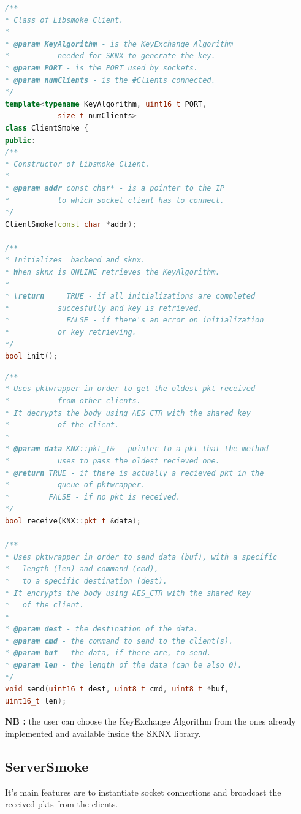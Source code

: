 \vspace{5mm}
\begin{lstlisting}[language=C++, caption={ClientSmoke}]
/**
* Class of Libsmoke Client.
*
* @param KeyAlgorithm - is the KeyExchange Algorithm
*			needed for SKNX to generate the key.
* @param PORT - is the PORT used by sockets.
* @param numClients - is the #Clients connected.
*/
template<typename KeyAlgorithm, uint16_t PORT,
			size_t numClients>
class ClientSmoke {
public:
/**
* Constructor of Libsmoke Client.
*
* @param addr const char* - is a pointer to the IP
*			to which socket client has to connect.
*/
ClientSmoke(const char *addr);

/**
* Initializes _backend and sknx.
* When sknx is ONLINE retrieves the KeyAlgorithm.
*
* \return     TRUE - if all initializations are completed
*			succesfully and key is retrieved.
*             FALSE - if there's an error on initialization
*			or key retrieving.
*/
bool init();
\end{lstlisting}

\newpage
\begin{lstlisting}[language=C++, caption={ClientSmoke}]
/**
* Uses pktwrapper in order to get the oldest pkt received
*			from other clients.
* It decrypts the body using AES_CTR with the shared key
*			of the client.
*
* @param data KNX::pkt_t& - pointer to a pkt that the method
*			uses to pass the oldest recieved one.
* @return TRUE - if there is actually a recieved pkt in the
*			queue of pktwrapper.
*         FALSE - if no pkt is received.
*/
bool receive(KNX::pkt_t &data);

/**
* Uses pktwrapper in order to send data (buf), with a specific
*	length (len) and command (cmd),
*	to a specific destination (dest).
* It encrypts the body using AES_CTR with the shared key
*	of the client.
*
* @param dest - the destination of the data.
* @param cmd - the command to send to the client(s).
* @param buf - the data, if there are, to send.
* @param len - the length of the data (can be also 0).
*/
void send(uint16_t dest, uint8_t cmd, uint8_t *buf,
uint16_t len);
\end{lstlisting}
\vspace{0.7cm}

\textbf{NB : }the user can choose the KeyExchange Algorithm from the ones already implemented and available inside the SKNX library.

\newpage
\subsection{ServerSmoke}
It's main features are to instantiate socket connections and broadcast the received pkts from the clients.

